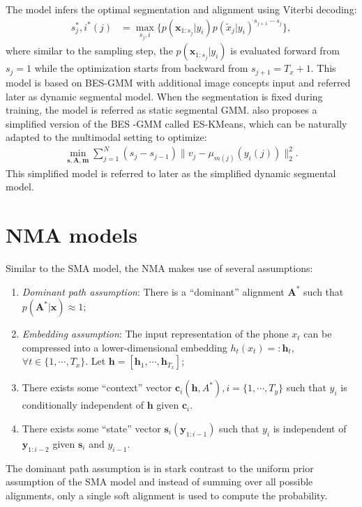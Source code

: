 \documentclass[journal]{IEEEtran}
\begin{document}
 The model infers the optimal segmentation and alignment using Viterbi decoding:
\begin{align}\label{eq:decode_besgmm}
    s_j^*, i^*(j) &= \max_{s_j, i}\{p(\mathbf x_{1:s_j}|y_{i})p(\tilde{x}_j|y_{i})^{s_{j+1}-s_j}\},
\end{align}
where similar to the sampling step, the $p(\mathbf x_{1:s_j}|y_{i})$ is evaluated forward from $s_j=1$ while the optimization starts from backward from $s_{j+1}=T_x+1$. This model is based on BES-GMM \cite{Kamper2017} with additional image concepts input and referred later as dynamic segmental model. When the segmentation is fixed during training, the model is referred as static segmental GMM. \cite{Kamper2017} also proposes a simplified version of the BES -GMM called ES-KMeans, which can be naturally adapted to the multimodal setting to optimize:
\begin{align}\label{eq:objective_multimodal_eskmeans}
    \min_{\mathbf s, \mathbf A, \mathbf m}\sum_{j=1}^{N}(s_j-s_{j-1})\|v_j - \mu_{m(j)}(y_i(j))\|_2^2.
\end{align}
This simplified model is referred to later as the simplified dynamic segmental model.

\section{NMA models}
Similar to the SMA model, the NMA makes use of several assumptions:
\begin{enumerate}
    \item \textit{Dominant path assumption}: There is a ``dominant'' alignment $\mathbf A^*$ such that $p(\mathbf A^*|\mathbf x) \approx 1$;
    \item \textit{Embedding assumption}: The input representation of the phone $x_t$ can be compressed into a lower-dimensional embedding $h_t(x_t) =: \mathbf h_t$, $\forall t \in \{1, \cdots, T_x\}$. Let $\mathbf h = [\mathbf h_1, \cdots, \mathbf h_{T_x}]$;
    \item There exists some ``context'' vector $\mathbf c_i(\mathbf h, A^*), i=\{1, \cdots, T_y\}$ such that $y_i$ is conditionally independent of $\mathbf h$ given $\mathbf c_i$.
    \item There exists some ``state'' vector $\mathbf s_i(\mathbf y_{1:i-1})$ such that $y_i$ is independent of $\mathbf y_{1:i-2}$ given $\mathbf s_i$ and $y_{i-1}$.
\end{enumerate}
The dominant path assumption is in stark contrast to the uniform prior assumption of the SMA model and instead of summing over all possible alignments, only a single soft alignment is used to compute the probability. 
\end{document}
